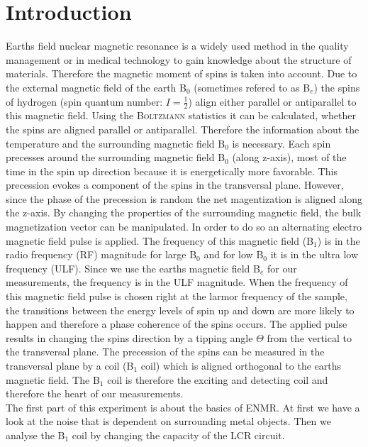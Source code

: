 \section{Introduction}
\label{sec:Introduction}
Earths field nuclear magnetic resonance is a widely used method in the quality management or in medical technology to gain knowledge about the structure of materials.
Therefore the magnetic moment of spins is taken into account.\newline
Due to the external magnetic field of the earth B$_0$ (sometimes refered to as B$_e$) the spins of hydrogen (spin quantum number: $I=\frac{1}{2}$) align either parallel or antiparallel to this magnetic field.
Using the \textsc{Boltzmann} statistics it can be calculated, whether the spins are aligned parallel or antiparallel.
Therefore the information about the temperature and the surrounding magnetic field B$_0$ is necessary.
Each spin precesses around the surrounding magnetic field B$_0$ (along z-axis), most of the time in the spin up direction because it is energetically more favorable.
This precession evokes a component of the spins in the transversal plane.
However, since the phase of the precession is random the net magentization is aligned along the z-axis.
By changing the properties of the surrounding magnetic field, the bulk magnetization vector can be manipulated.
In order to do so an alternating electro magnetic field pulse is applied.
The frequency of this magnetic field (B$_1$) is in the radio frequency (RF) magnitude for large B$_0$ and for low B$_0$ it is in the ultra low frequency (ULF).
Since we use the earths magnetic field B$_e$ for our measurements, the frequency is in the ULF magnitude.
When the frequency of this magnetic field pulse is chosen right at the larmor frequency of the sample, the transitions between the energy levels of spin up and down are more likely to happen and therefore a phase coherence of the spins occurs.
The applied pulse results in changing the spins direction by a tipping angle $\Theta$ from the vertical to the transversal plane.
The precession of the spins can be measured in the transversal plane by a coil (B$_1$ coil) which is aligned orthogonal to the earths magnetic field.
The B$_1$ coil is therefore the exciting and detecting coil and therefore the heart of our measurements. \\
The first part of this experiment is about the basics of ENMR.
At first we have a look at the noise that is dependent on surrounding metal objects.
Then we analyse the B$_1$ coil by changing the capacity of the LCR circuit.
